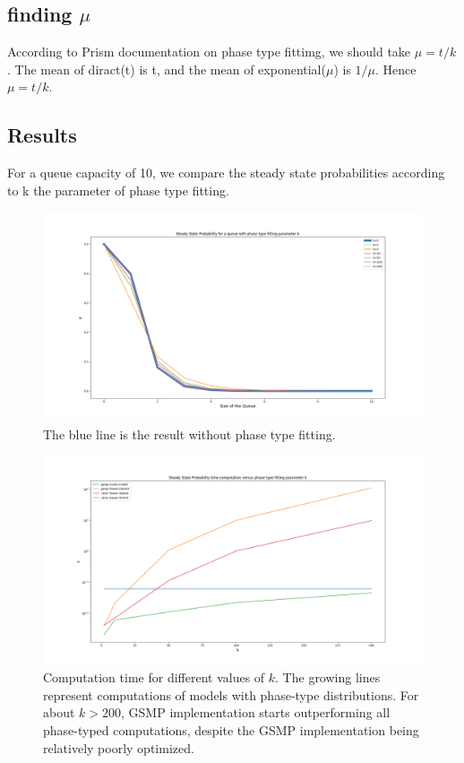 \documentclass[paper=a4, fontsize=11pt]{scrartcl}
\numberwithin{equation}{section}		%
\numberwithin{figure}{section}			%
\numberwithin{table}{section}				%
\begin{document}
	
	
	
	\subsection{finding $\mu$}
	
	According to Prism documentation on phase type fittimg, we should take $\mu = t/k$. The mean of diract(t) is t, and the mean of exponential($\mu$) is $1/\mu$. Hence $\mu = t/k$.
	
	
	
	\subsection{Results}
	
	For a queue capacity of 10, we compare the steady state probabilities according to k the parameter of phase type fitting.
	
	\begin{figure}
		\centering
		\includegraphics[width=18cm]{sspqueue.png}
		\caption{The blue line is the result without phase type fitting.}
		\label{fig:res1}
	\end{figure}
	
	\begin{figure}
		\centering
		\includegraphics[width=16cm]{time.png}
		\caption{Computation time for different values of $k$. The growing lines represent computations of models with phase-type distributions. For about $k>200$, GSMP implementation starts outperforming all phase-typed computations, despite the GSMP implementation being relatively poorly optimized.}
		\label{fig:time1}
	\end{figure}	
	
\end{document}

